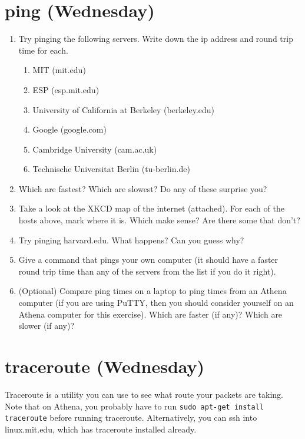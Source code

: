 \documentclass{article}
\begin{document}
\section{ping (Wednesday)}

\begin{enumerate}[a]
\item Try pinging the following servers.  Write down the ip address and round trip time for each.
  \begin{enumerate}
    \item MIT (mit.edu)
    \item ESP (esp.mit.edu)
    \item University of California at Berkeley (berkeley.edu)
    \item Google (google.com)
    \item Cambridge University (cam.ac.uk)
    \item Technische Universitat Berlin (tu-berlin.de)
  \end{enumerate}

\item Which are fastest?  Which are slowest?  Do any of these surprise you?
\item Take a look at the XKCD map of the internet (attached).  For each of the hosts above, mark where it is.  Which make sense?  Are there some that don't?
\item Try pinging harvard.edu.  What happens?  Can you guess why?
\item Give a command that pings your own computer (it should have a faster round trip time than any of the servers from the list if you do it right).
\item (Optional)  Compare ping times on a laptop to ping times from an Athena computer (if you are using PuTTY, then you should consider yourself on an Athena computer for this exercise).  Which are faster (if any)?  Which are slower (if any)?
\end{enumerate}


\section{traceroute (Wednesday)}
Traceroute is a utility you can use to see what route your packets are taking.  Note that on Athena, you probably have to run \texttt{sudo apt-get install traceroute} before running traceroute.  Alternatively, you can ssh into linux.mit.edu, which has traceroute installed already.
\end{document}
